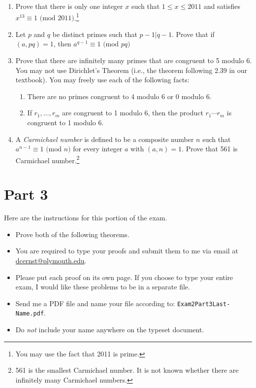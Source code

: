 \documentclass[11pt]{article}
\theoremstyle{definition}
\begin{document}
\begin{enumerate}[resume]

\item Prove that there is only one integer $x$ such that $1\leq x\leq 2011$ and satisfies $x^{13}\equiv 1 \mbox{ (mod } 2011)$.\footnote{You may use the fact that 2011 is prime.}

\item Let $p$ and $q$ be distinct primes such that $p-1|q-1$.  Prove that if $(a,pq)=1$, then $a^{q-1}\equiv 1 \mbox{ (mod } pq)$

\item Prove that there are infinitely many primes that are congruent to 5 modulo 6.  You may not use Dirichlet's Theorem (i.e., the theorem following 2.39 in our textbook).  You may freely use each of the following facts:
\begin{enumerate}
\item There are no primes congruent to 4 modulo 6 or 0 modulo 6.

\item If $r_{1},\ldots, r_{m}$ are congruent to 1 modulo 6, then the product $r_{1}\cdots r_{m}$ is congruent to 1 modulo 6.
\end{enumerate}

\item A \emph{Carmichael number} is defined to be a composite number $n$ such that $a^{n-1}\equiv 1 \mbox{ (mod } n)$ for every integer $a$ with $(a,n)=1$.  Prove that 561 is Carmichael number.\footnote{561 is the smallest Carmichael number.  It is not known whether there are infinitely many Carmichael numbers.}
\end{enumerate}

\section*{Part 3}

Here are the instructions for this portion of the exam.

\begin{itemize}

\item Prove both of the following theorems.

\item You are required to type your proofs and submit them to me via email at \url{dcernst@plymouth.edu}.  

\item Please put each proof on its own page.  If you choose to type your entire exam, I would like these problems to be in a separate file.  

\item Send me a PDF file and name your file according to: \texttt{Exam2Part3Last-Name.pdf}.  

\item Do \emph{not} include your name anywhere on the typeset document.

\end{itemize}
\end{document}
